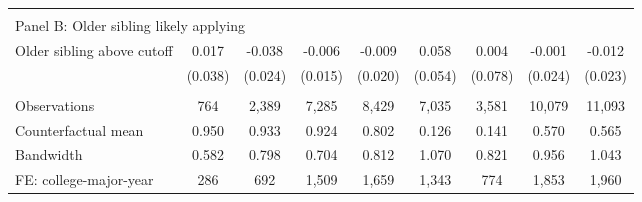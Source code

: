 {{\begin{tabular}{lcccccccc}
&  &  &  & & & & & &    \\
\multicolumn{9}{l}{Panel B: Older sibling likely applying} \\
Older sibling above cutoff&       0.017   &      -0.038   &      -0.006   &      -0.009   &       0.058   &       0.004   &      -0.001   &      -0.012   \\
                    &     (0.038)   &     (0.024)   &     (0.015)   &     (0.020)   &     (0.054)   &     (0.078)   &     (0.024)   &     (0.023)   \\
                    &               &               &               &               &               &               &               &               \\
Observations        &         764   &       2,389   &       7,285   &       8,429   &       7,035   &       3,581   &      10,079   &      11,093   \\
Counterfactual mean &       0.950   &       0.933   &       0.924   &       0.802   &       0.126   &       0.141   &       0.570   &       0.565   \\
Bandwidth           &       0.582   &       0.798   &       0.704   &       0.812   &       1.070   &       0.821   &       0.956   &       1.043   \\
FE: college-major-year&         286   &         692   &       1,509   &       1,659   &       1,343   &         774   &       1,853   &       1,960   \\
 

\bottomrule
\end{tabular}
}
}
